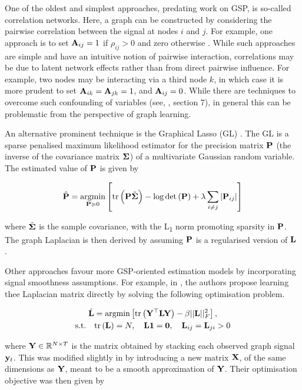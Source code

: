 One of the oldest and simplest approaches, predating work on GSP, is so-called correlation networks. Here, a graph can be constructed by considering the pairwise correlation between the signal at nodes $i$ and $j$. For example, one approach is to set $\mathbf{A}_{ij} = 1$ if $\rho_{ij} > 0$ and zero otherwise \citep{Mateos2019}. While such approaches are simple and have an intuitive notion of pairwise interaction, correlations may be due to latent network effects rather than from direct pairwise influence. For example, two nodes may be interacting via a third node $k$, in which case it is more prudent to set $\mathbf{A}_{ik} = \mathbf{A}_{jk} = 1$, and $\mathbf{A}_{ij} = 0$. While there are techniques to overcome such confounding of variables (see, \cite{Kolaczyk2009}, section 7), in general this can be problematic from the perspective of graph learning. 

An alternative prominent technique is the Graphical Lasso (GL) \citep{Friedman2007}. The GL is a sparse penalised maximum likelihood estimator for the precision matrix $\mathbf{P}$ (the inverse of the covariance matrix $\mathbf{\Sigma}$) of a multivariate Gaussian random variable. The estimated value of $\mathbf{P}$ is given by 

\begin{equation}
    \hat{\mathbf{P}} = \underset{\mathbf{P} \succcurlyeq 0}{\text{argmin}} \left[\text{\textup{tr}}\left(\mathbf{P} \hat{\mathbf{\Sigma}}\right) - \log \det \left(\mathbf{P}\right) + \lambda \sum_{i\neq j} |\mathbf{P}_{ij}|\right]
\end{equation}

where $\hat{\mathbf{\Sigma}}$ is the sample covariance, with the L\textsubscript{1} norm promoting sparsity in $\mathbf{P}$. The graph Laplacian is then derived by assuming $\mathbf{P}$ is a regularised version of $\mathbf{L}$ \citep{Lake2010}. 

Other approaches favour more GSP-oriented estimation models by incorporating signal smoothness assumptions. For example, in \cite{Hu2015}, the authors propose learning thee Laplacian matrix directly by solving the following optimisation problem. 

\begin{equation}
    \begin{gathered}
        \hat{\mathbf{L}} = \text{argmin} \left[ \text{\textup{tr}}\left(\mathbf{Y}^\top \mathbf{L} \mathbf{Y}\right) - \beta ||\mathbf{L} ||_F^2 \right], \\ \text{s.t.} \quad \text{\textup{tr}}\left(\mathbf{L}\right) = N, \quad \mathbf{L} \mathbf{1} = \mathbf{0}, \quad \mathbf{L}_{ij} = \mathbf{L}_{ji} >0
    \end{gathered}
\end{equation}

where $\mathbf{Y} \in \mathbb{R}^{N \times T}$ is the matrix obtained by stacking each observed graph signal $\mathbf{y}_t$. This was modified slightly in \cite{Dong2016} by introducing a new matrix $\mathbf{X}$, of the same dimensions as $\mathbf{Y}$, meant to be a smooth approximation of $\mathbf{Y}$. Their optimisation objective was then given by 

